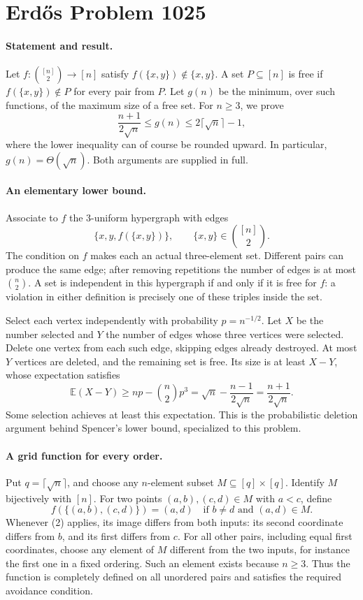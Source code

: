 \section*{Erd\H{o}s Problem 1025}

\paragraph{Statement and result.}
Let \(f:\binom{[n]}2\to[n]\) satisfy \(f(\{x,y\})\notin\{x,y\}\). A set \(P\subseteq[n]\) is free if \(f(\{x,y\})\notin P\) for every pair from \(P\). Let \(g(n)\) be the minimum, over such functions, of the maximum size of a free set. For \(n\geq3\), we prove
\[
 \frac{n+1}{2\sqrt n}\leq g(n)\leq2\lceil\sqrt n\rceil-1,
\]
where the lower inequality can of course be rounded upward. In particular, \(g(n)=\Theta(\sqrt n)\). Both arguments are supplied in full.

\paragraph{An elementary lower bound.}
Associate to \(f\) the 3-uniform hypergraph with edges
\[
 \{x,y,f(\{x,y\})\},\qquad \{x,y\}\in\binom{[n]}2.
\]
The condition on \(f\) makes each an actual three-element set. Different pairs can produce the same edge; after removing repetitions the number of edges is at most \(\binom n2\).
A set is independent in this hypergraph if and only if it is free for \(f\): a violation in either definition is precisely one of these triples inside the set.

Select each vertex independently with probability \(p=n^{-1/2}\). Let \(X\) be the number selected and \(Y\) the number of edges whose three vertices were selected. Delete one vertex from each such edge, skipping edges already destroyed. At most \(Y\) vertices are deleted, and the remaining set is free. Its size is at least \(X-Y\), whose expectation satisfies
\[
 \mathbb E(X-Y)\geq np-\binom n2p^3
 =\sqrt n-\frac{n-1}{2\sqrt n}
 =\frac{n+1}{2\sqrt n}. \tag{1}
\]
Some selection achieves at least this expectation. This is the probabilistic deletion argument behind Spencer's lower bound, specialized to this problem.

\paragraph{A grid function for every order.}
Put \(q=\lceil\sqrt n\rceil\), and choose any \(n\)-element subset \(M\subseteq[q]\times[q]\). Identify \(M\) bijectively with \([n]\).
For two points \((a,b),(c,d)\in M\) with \(a<c\), define
\[
 f(\{(a,b),(c,d)\})=(a,d)
 \quad\text{if }b\ne d\text{ and }(a,d)\in M. \tag{2}
\]
Whenever (2) applies, its image differs from both inputs: its second coordinate differs from \(b\), and its first differs from \(c\). For all other pairs, including equal first coordinates, choose any element of \(M\) different from the two inputs, for instance the first one in a fixed ordering. Such an element exists because \(n\geq3\). Thus the function is completely defined on all unordered pairs and satisfies the required avoidance condition.

